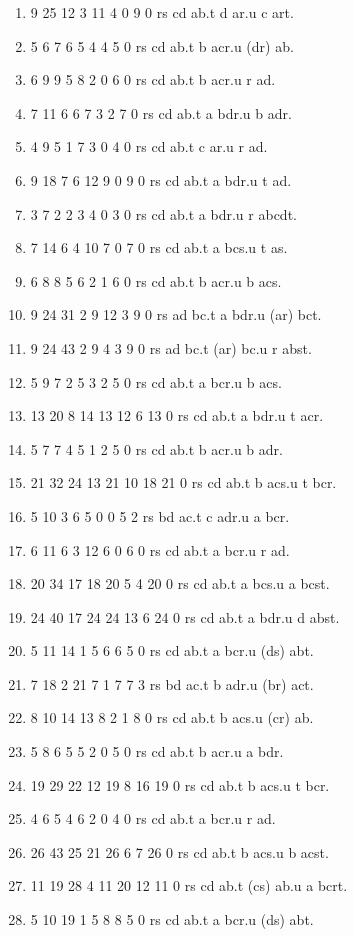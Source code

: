 \documentclass[10pt,journal]{IEEEtran}
\begin{document}
\begin{enumerate}
\item 9 25 12 3 11 4 0 9 0 rs cd ab.t d ar.u c art.
\item 5 6 7 6 5 4 4 5 0 rs cd ab.t b acr.u (dr) ab.
\item 6 9 9 5 8 2 0 6 0 rs cd ab.t b acr.u r ad.
\item 7 11 6 6 7 3 2 7 0 rs cd ab.t a bdr.u b adr.
\item 4 9 5 1 7 3 0 4 0 rs cd ab.t c ar.u r ad.
\item 9 18 7 6 12 9 0 9 0 rs cd ab.t a bdr.u t ad.
\item 3 7 2 2 3 4 0 3 0 rs cd ab.t a bdr.u r abcdt.
\item 7 14 6 4 10 7 0 7 0 rs cd ab.t a bcs.u t as.
\item 6 8 8 5 6 2 1 6 0 rs cd ab.t b acr.u b acs.
\item 9 24 31 2 9 12 3 9 0 rs ad bc.t a bdr.u (ar) bct.
\item 9 24 43 2 9 4 3 9 0 rs ad bc.t (ar) bc.u r abst.
\item 5 9 7 2 5 3 2 5 0 rs cd ab.t a bcr.u b acs.
\item 13 20 8 14 13 12 6 13 0 rs cd ab.t a bdr.u t acr.
\item 5 7 7 4 5 1 2 5 0 rs cd ab.t b acr.u b adr.
\item 21 32 24 13 21 10 18 21 0 rs cd ab.t b acs.u t bcr.
\item 5 10 3 6 5 0 0 5 2 rs bd ac.t c adr.u a bcr.
\item 6 11 6 3 12 6 0 6 0 rs cd ab.t a bcr.u r ad.
\item 20 34 17 18 20 5 4 20 0 rs cd ab.t a bcs.u a bcst.
\item 24 40 17 24 24 13 6 24 0 rs cd ab.t a bdr.u d abst.
\item 5 11 14 1 5 6 6 5 0 rs cd ab.t a bcr.u (ds) abt.
\item 7 18 2 21 7 1 7 7 3 rs bd ac.t b adr.u (br) act.
\item 8 10 14 13 8 2 1 8 0 rs cd ab.t b acs.u (cr) ab.
\item 5 8 6 5 5 2 0 5 0 rs cd ab.t b acr.u a bdr.
\item 19 29 22 12 19 8 16 19 0 rs cd ab.t b acs.u t bcr.
\item 4 6 5 4 6 2 0 4 0 rs cd ab.t a bcr.u r ad.
\item 26 43 25 21 26 6 7 26 0 rs cd ab.t b acs.u b acst.
\item 11 19 28 4 11 20 12 11 0 rs cd ab.t (cs) ab.u a bcrt.
\item 5 10 19 1 5 8 8 5 0 rs cd ab.t a bcr.u (ds) abt.

\end{enumerate}
\end{document}
